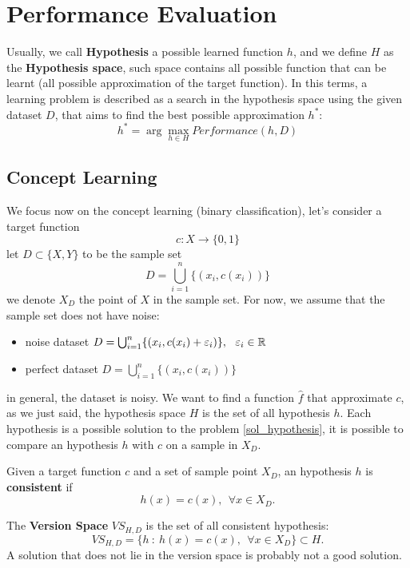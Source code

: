 \documentclass[10pt, letterpaper]{report}
\begin{document}
\section{Performance Evaluation}
Usually, we call \textbf{Hypothesis} a possible learned function $h$, and we define $H$ as the \textbf{Hypothesis space}, such space contains all possible function that can be learnt (all possible approximation of the target function). In this terms, a learning problem is described as a search in the hypothesis space using the given dataset $D$, that aims to find the best possible approximation $h^*$:\begin{equation}\label{sol_hypothesis}
    h^*=\arg \max_{h\in H} Performance(h,D)
\end{equation} 
\subsection{Concept Learning}
We focus now on the concept learning (binary classification), let's consider a target function\begin{equation}
    c:X\rightarrow \{0,1\}
\end{equation}
let $D\subset \{X,Y\}$ to be the sample set\begin{equation}
    D=\bigcup_{i=1}^n\{(x_i,c(x_i))\}
\end{equation}
we denote $X_D$ the point of $X$ in the sample set. For now, we assume that the sample set does not have noise:\begin{itemize}
    \item noise dataset $D=\bigcup_{i=1}^n\{(x_i,c(x_i)+\varepsilon_i)\}, \ \ \varepsilon_i\in\R$
    \item perfect dataset $D=\bigcup_{i=1}^n\{(x_i,c(x_i))\}$
\end{itemize}
in general, the dataset is noisy. We want to find a function $\hat f$ that approximate $c$, as we just said, the hypothesis space $H$ is the set of all hypothesis $h$.\bigskip
Each hypothesis is a possible solution to the problem \eqref{sol_hypothesis},  it is possible to compare an hypothesis  $h$ with $c$ on a sample in $X_D$.
\begin{definition}
    Given a target function $c$ and a set of sample point $X_D$, an hypothesis $h$ is \textbf{consistent} if\begin{equation}
        h(x)=c(x), \ \ \forall x\in X_D.
    \end{equation}
\end{definition}
The \textbf{Version Space} $VS_{H,D}$ is the set of all consistent hypothesis:\begin{equation}
    VS_{H,D}=\{h \ : \ h(x)=c(x), \ \ \forall x\in X_D\}\subset H.
\end{equation}
A solution that does not lie in the version space is probably not a good solution.\bigskip 
\end{document}
